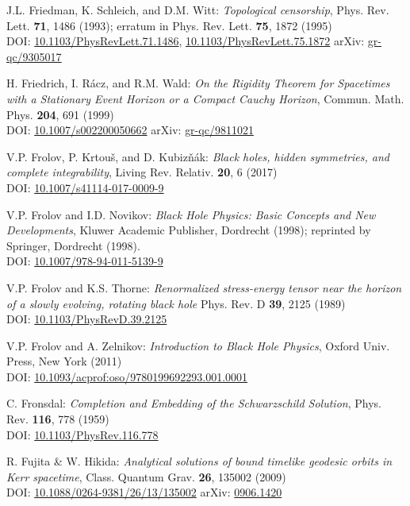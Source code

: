 \begin{thebibliography}{123}
J.L. Friedman, K. Schleich, and D.M. Witt:
{\em Topological censorship},
Phys. Rev. Lett. {\bf 71}, 1486 (1993); erratum in Phys. Rev. Lett. {\bf 75}, 1872 (1995)\\
DOI: \href{https://doi.org/10.1103/PhysRevLett.71.1486}{10.1103/PhysRevLett.71.1486},
\href{https://doi.org/10.1103/PhysRevLett.75.1872}{10.1103/PhysRevLett.75.1872}\hfill
arXiv: \href{https://arxiv.org/abs/gr-qc/9305017}{gr-qc/9305017}

H. Friedrich, I. Rácz, and R.M. Wald:
{\em On the Rigidity Theorem for Spacetimes with a Stationary Event Horizon or a Compact Cauchy Horizon},
Commun. Math. Phys. {\bf 204}, 691 (1999)\\
DOI: \href{https://doi.org/10.1007/s002200050662}{10.1007/s002200050662}\hfill
arXiv: \href{https://arxiv.org/abs/gr-qc/9811021}{gr-qc/9811021}

V.P. Frolov, P. Krtouš, and D. Kubizňák:
{\em Black holes, hidden symmetries, and complete integrability},
Living Rev. Relativ. {\bf 20}, 6 (2017) \\
DOI: \href{https://doi.org/10.1007/s41114-017-0009-9}{10.1007/s41114-017-0009-9}

V.P. Frolov and I.D. Novikov:
{\em Black Hole Physics: Basic Concepts and New Developments},
Kluwer Academic Publisher, Dordrecht (1998); reprinted by
Springer, Dordrecht (1998). \\
DOI: \href{https://doi.org/10.1007/978-94-011-5139-9}{10.1007/978-94-011-5139-9}

V.P. Frolov and K.S. Thorne:
{\em Renormalized stress-energy tensor near the horizon of a slowly evolving, rotating black hole}
Phys. Rev. D {\bf 39}, 2125 (1989)\\
DOI: \href{https://doi.org/10.1103/PhysRevD.39.2125}{10.1103/PhysRevD.39.2125}

V.P. Frolov and A. Zelnikov:
{\em Introduction to Black Hole Physics},
Oxford Univ. Press, New York (2011)\\
DOI: \href{https://doi.org/10.1093/acprof:oso/9780199692293.001.0001}{10.1093/acprof:oso/9780199692293.001.0001}

C. Fronsdal: {\em Completion and Embedding of the Schwarzschild Solution},
Phys. Rev. {\bf 116}, 778 (1959) \\
DOI: \href{https://doi.org/10.1103/PhysRev.116.778}{10.1103/PhysRev.116.778}

R. Fujita \& W. Hikida:
{\em Analytical solutions of bound timelike geodesic orbits in Kerr spacetime},
Class. Quantum Grav. {\bf 26}, 135002 (2009) \\
DOI: \href{https://doi.org/10.1088/0264-9381/26/13/135002}{10.1088/0264-9381/26/13/135002}\hfill
arXiv: \href{https://arxiv.org/abs/0906.1420}{0906.1420}


\end{thebibliography}
